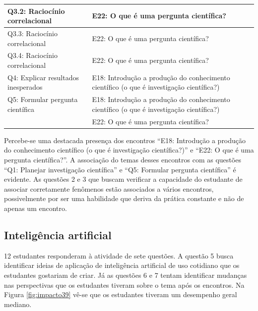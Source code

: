 \documentclass[
]{book}
\begin{document}
\begin{table}
\begin{tabular}[t]{l|l}
\hline
Q3.2: Raciocínio correlacional & E22: O que é uma pergunta científica?\\
\hline
Q3.3: Raciocínio correlacional & E22: O que é uma pergunta científica?\\
\hline
Q3.4: Raciocínio correlacional & E22: O que é uma pergunta científica?\\
\hline
Q4: Explicar resultados inesperados & E18: Introdução a produção do conhecimento científico (o que é investigação científica?)\\
\hline
Q5: Formular pergunta científica & E18: Introdução a produção do conhecimento científico (o que é investigação científica?)\\
\hline
 & E22: O que é uma pergunta científica?\\
\hline
\end{tabular}
\end{table}

Percebe-se uma destacada presença dos encontros ``E18: Introdução a produção do conhecimento científico (o que é investigação científica?)'' e ``E22: O que é uma pergunta científica?''. A associação do temas desses encontros com as questões ``Q1: Planejar investigação científica'' e ``Q5: Formular pergunta científica'' é evidente. As questões 2 e 3 que buscam verificar a capacidade do estudante de associar corretamente fenômenos estão associados a vários encontros, possivelmente por ser uma habilidade que deriva da prática constante e não de apenas um encontro.

\hypertarget{inteliguxeancia-artificial}{%
\subsection{Inteligência artificial}\label{inteliguxeancia-artificial}}

12 estudantes responderam à atividade de sete questões. A questão 5 busca identificar ideias de aplicação de inteligência artificial de uso cotidiano que os estudantes gostariam de criar. Já as questões 6 e 7 tentam identificar mudanças nas perspectivas que os estudantes tiveram sobre o tema após os encontros. Na Figura \ref{fig:impacto39} vê-se que os estudantes tiveram um desempenho geral mediano.
\end{document}
